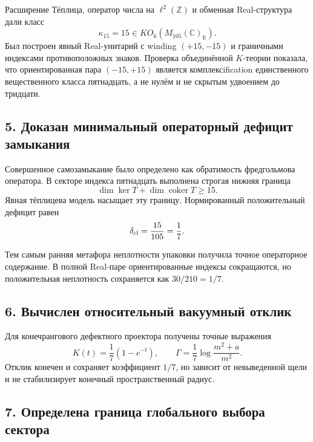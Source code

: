 Расширение Тёплица, оператор числа на $\ell^2(\mathbb Z)$ и обменная
Real-структура дали класс
\begin{equation}
 \kappa_{15}=15\in KO_6(M_{105}(\mathbb C)_{\mathbb R}).
\end{equation}
Был построен явный Real-унитарий с winding $(+15,-15)$ и граничными
индексами противоположных знаков. Проверка объединённой $K$-теории
показала, что ориентированная пара $(-15,+15)$ является комплексification
единственного вещественного класса пятнадцать, а не нулём и не скрытым
удвоением до тридцати.

\subsection*{5. Доказан минимальный операторный дефицит замыкания}

Совершенное самозамыкание было определено как обратимость фредгольмова
оператора. В секторе индекса пятнадцать выполнена строгая нижняя граница
\begin{equation}
 \dim\ker T+\dim\operatorname{coker}T\geq15.
\end{equation}
Явная тёплицева модель насыщает эту границу. Нормированный положительный
дефицит равен
\begin{equation}
 \delta_{\rm cl}=\frac{15}{105}=\frac17.
\end{equation}

Тем самым ранняя метафора неплотности упаковки получила точное
операторное содержание. В полной Real-паре ориентированные индексы
сокращаются, но положительная неплотность сохраняется как $30/210=1/7$.

\subsection*{6. Вычислен относительный вакуумный отклик}

Для конечрангового дефектного проектора получены точные выражения
\begin{equation}
 K(t)=\frac17(1-e^{-t}),
 \qquad
 \Gamma=\frac17\log\frac{m^2+a}{m^2}.
\end{equation}
Отклик конечен и сохраняет коэффициент $1/7$, но зависит от невыведенной
щели и не стабилизирует конечный пространственный радиус.

\subsection*{7. Определена граница глобального выбора сектора}

